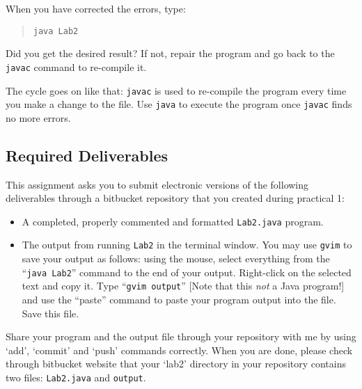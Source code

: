 When you have corrected the errors, type:
\begin{quote}
{\tt java Lab2}
\end{quote}
Did you get the desired result? If not, repair the program and go back to
the {\tt javac} command to re-compile it.

The cycle goes on like that: {\tt javac} is used to re-compile the
program every time you make a change
to the file. Use {\tt java} to execute the program once {\tt javac}
finds no more errors.

\subsection*{Required Deliverables}
This assignment asks you to submit electronic versions of the following deliverables through
a bitbucket repository that you created during practical 1: 
\begin{itemize}
	\item A completed, properly commented and formatted {\tt Lab2.java} program.
	\item The output from running {\tt Lab2} in the terminal window. You may use {\tt gvim} to save
	your output as follows: using the mouse,
select everything from the ``{\tt java Lab2}'' command to the end of your output.
Right-click on the selected text and copy it.
Type ``{\tt gvim output}'' [Note that this {\em not} a Java program!]
and use the ``paste'' command to paste your program output into the file.
 Save this file.
\end{itemize}

Share your program and the output file through your repository with me by using `add', `commit' and `push' commands correctly. When you are done, please check through bitbucket website that your `lab2' directory in your repository contains two files: {\tt Lab2.java} and {\tt output}.


